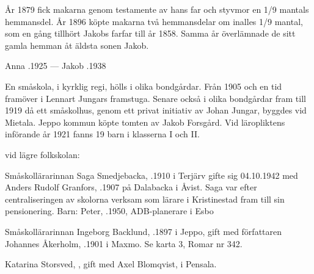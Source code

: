 År 1879 fick makarna genom testamente av hans far och styvmor en 1/9 mantals hemmansdel. År 1896 köpte makarna två hemmansdelar om inalles 1/9 mantal, som en gång tillhört Jakobs farfar till år 1858. Samma år överlämnade de sitt gamla hemman åt äldsta sonen Jakob.

Anna .1925  ---  Jakob .1938






En småskola, i kyrklig regi, hölls i olika bondgårdar. Från 1905 och en tid framöver i Lennart Jungars framstuga. Senare också i olika bondgårdar fram till 1919 då ett småskolhus, genom ett privat initiativ av Johan Jungar, byggdes vid Mietala. Jeppo kommun köpte tomten av Jakob Forsgård. Vid läropliktens införande år 1921 fanns 19 barn i klasserna I och II.


 vid lägre folkskolan:

Småskollärarinnan Saga Smedjebacka, .1910 i Terjärv gifte sig 04.10.1942 med Anders Rudolf Granfors, .1907 på Dalabacka i Åvist. Saga var efter centraliseringen av skolorna verksam som lärare i Kristinestad fram till sin pensionering.
Barn: Peter, .1950, ADB-planerare i Esbo


Småskollärarinnan Ingeborg Backlund, .1897 i Jeppo, gift med författaren Johannes Åkerholm, .1901 i Maxmo. Se karta 3, Romar nr 342.
\begin{jhchildren}
  \item {}
  \item {}
  \item {}
\end{jhchildren}


Katarina Storsved, , gift med Axel Blomqvist,  i Pensala.
\begin{jhchildren}
  \item {}
  \item {}
  \item {}
  \item {}
\end{jhchildren}



